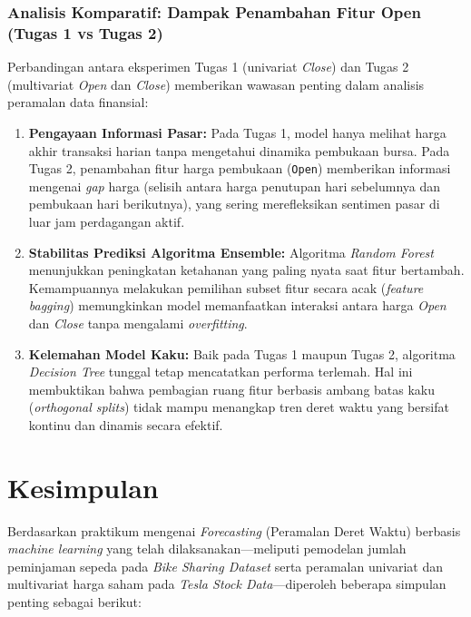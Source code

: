 \documentclass[a4paper,oneside,11pt]{book}
\begin{document}
\subsection{Analisis Komparatif: Dampak Penambahan Fitur Open (Tugas 1 vs Tugas 2)}
Perbandingan antara eksperimen Tugas 1 (univariat \textit{Close}) dan Tugas 2 (multivariat \textit{Open} dan \textit{Close}) memberikan wawasan penting dalam analisis peramalan data finansial:
\begin{enumerate}
    \item \textbf{Pengayaan Informasi Pasar:} Pada Tugas 1, model hanya melihat harga akhir transaksi harian tanpa mengetahui dinamika pembukaan bursa. Pada Tugas 2, penambahan fitur harga pembukaan (\texttt{Open}) memberikan informasi mengenai \textit{gap} harga (selisih antara harga penutupan hari sebelumnya dan pembukaan hari berikutnya), yang sering merefleksikan sentimen pasar di luar jam perdagangan aktif.
    \item \textbf{Stabilitas Prediksi Algoritma Ensemble:} Algoritma \textit{Random Forest} menunjukkan peningkatan ketahanan yang paling nyata saat fitur bertambah. Kemampuannya melakukan pemilihan subset fitur secara acak (\textit{feature bagging}) memungkinkan model memanfaatkan interaksi antara harga \textit{Open} dan \textit{Close} tanpa mengalami \textit{overfitting}.
    \item \textbf{Kelemahan Model Kaku:} Baik pada Tugas 1 maupun Tugas 2, algoritma \textit{Decision Tree} tunggal tetap mencatatkan performa terlemah. Hal ini membuktikan bahwa pembagian ruang fitur berbasis ambang batas kaku (\textit{orthogonal splits}) tidak mampu menangkap tren deret waktu yang bersifat kontinu dan dinamis secara efektif.
\end{enumerate}

\chapter{Kesimpulan}
\label{chap:kesimpulan}
Berdasarkan praktikum mengenai \textit{Forecasting} (Peramalan Deret Waktu) berbasis \textit{machine learning} yang telah dilaksanakan—meliputi pemodelan jumlah peminjaman sepeda pada \textit{Bike Sharing Dataset} serta peramalan univariat dan multivariat harga saham pada \textit{Tesla Stock Data}—diperoleh beberapa simpulan penting sebagai berikut:
\end{document}
